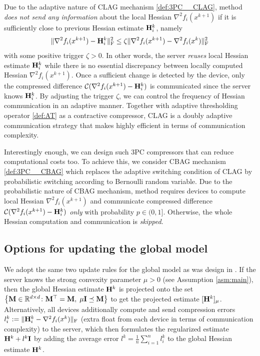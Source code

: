 \documentclass[11pt]{article}
\begin{document}
	Due to the adaptive nature of CLAG mechanism \eqref{def:3PC__CLAG},  method {\em does not send any information} about the local Hessian $\nabla^2 f_i(x^{k+1})$ if it is sufficiently close to previous Hessian estimate $\mathbf{H}_i^k$, namely $$\|\nabla^2 f_i(x^{k+1}) - \mathbf{H}_i^k\|^2_{\rm F} \le \zeta\|\nabla^2 f_i(x^{k+1}) - \nabla^2 f_i(x^{k})\|^2_{\rm F}$$ with some positive trigger $\zeta>0$. In other words, the server {\em reuses} local Hessian estimate $\mathbf{H}_i^k$ while there is no essential discrepancy between locally computed Hessian $\nabla^2 f_i(x^{k+1})$. Once a sufficient change is detected by the device, only the compressed difference ${\mathcal{C}}(\nabla^2 f_i(x^{k+1}) - \mathbf{H}_i^k)$ is communicated since the server knows $\mathbf{H}_i^k$. By adjusting the trigger $\zeta$, we can control the frequency of Hessian communication in an adaptive manner. Together with adaptive thresholding operator \eqref{def:AT} as a contractive compressor, CLAG is a doubly adaptive communication strategy that makes  highly efficient in terms of communication complexity.
	
	Interestingly enough, we can design such 3PC compressors that can reduce computational costs too. To achieve this, we consider CBAG mechanism \eqref{def:3PC__CBAG} which replaces the adaptive switching condition of CLAG by probabilistic switching according to Bernoulli random variable. Due to the probabilistic nature of CBAG mechanism,  method requires devices to compute local Hessian $\nabla^2 f_i(x^{k+1})$ and communicate compressed difference ${\mathcal{C}}(\nabla^2 f_i(x^{k+1}) - \mathbf{H}_i^k)$ {\em only} with probability $p\in(0,1]$. Otherwise, the whole Hessian computation and communication is {\em skipped}.

	
	\subsection{Options for updating the global model}
	We adopt the same two update rules for the global model as was design in . If the server knows the strong convexity parameter $\mu>0$ (see Assumption \ref{asm:main}), then the global Hessian estimate $\mathbf{H}^k$ is projected onto the set $\left\{\mathbf{M}\in\mathbb{R}^{d\times d} \colon \mathbf{M}^\top = \mathbf{M},\; \mu\mathbf{I} \preceq \mathbf{M} \right\}$ to get the projected estimate $[\mathbf{H}^k]_{\mu}$. 
	Alternatively, all devices additionally compute and send compression errors $l_i^k \; { := }\; \|\mathbf{H}_i^k - \nabla^2 f_i(x^k)\|_{\rm F}$ (extra float from each device in terms of communication complexity) to the server, which then formulates the regularized estimate $\mathbf{H}^k + l^k\mathbf{I}$ by adding the average error $l^k = \frac{1}{n}\sum_{i=1}^n l_i^k$ to the global Hessian estimate $\mathbf{H}^k$. 
	
\end{document}
